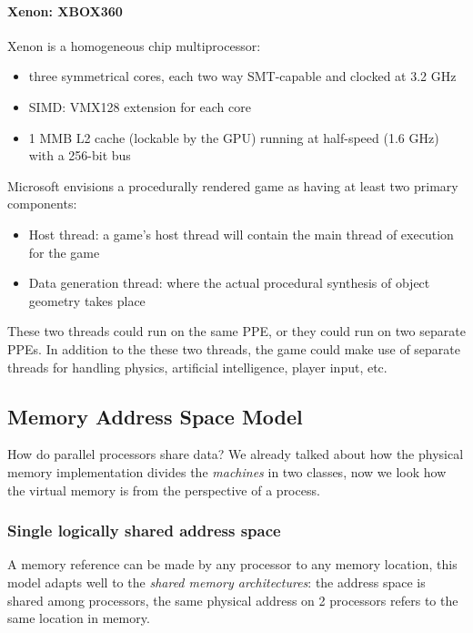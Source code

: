 \paragraph{Xenon: XBOX360}
Xenon is a homogeneous chip multiprocessor:
\begin{itemize}
    \item three symmetrical cores, each two way SMT-capable and clocked at 3.2 GHz
    \item SIMD: VMX128 extension for each core
    \item 1 MMB L2 cache (lockable by the GPU) running at half-speed (1.6 GHz) with a 256-bit bus
\end{itemize}

Microsoft envisions a procedurally rendered game
as having at least two primary components:
\begin{itemize}
    \item Host thread: a game's host thread will contain the main
thread of execution for the game
    \item Data generation thread: where the actual procedural
synthesis of object geometry takes place
\end{itemize}
These two threads could run on the same PPE, or
they could run on two separate PPEs.
In addition to the these two threads, the game
could make use of separate threads for handling
physics, artificial intelligence, player input, etc.

\subsection{Memory Address Space Model}\label{subsec:memory-address-space-model}
How do parallel processors share data?
We already talked about how the physical memory implementation divides the \textit{machines} in two classes, now we 
look how the virtual memory is from the perspective of a process.

\subsubsection{Single logically shared address space}
A memory reference can be made by any processor to any memory location, this model adapts well to the
\textit{shared memory architectures}: the address space is shared among processors, the same physical address on 2
processors refers to the same location in memory.

